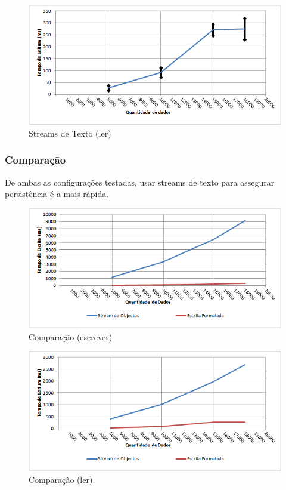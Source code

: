 \documentclass[a5paper,twocolumn, 11pt]{article}
\begin{document}
\begin{figure}[h!b!t!]
    \caption[Streams de Texto (ler)]{Streams de Texto (ler)}
    \centering
        \includegraphics[width=400pt]{ef_2.png}
\end{figure}

\newpage
\twocolumn
\subsubsection{Comparação}
De ambas as configurações testadas, usar streams de texto para assegurar persistência é a mais rápida.
\clearpage
\onecolumn
\begin{figure}[h!b!t!]
    \caption[Comparação (escrever)]{Comparação (escrever)}
    \centering
        \includegraphics[width=400pt]{cmp_1.png}
\end{figure}
\begin{figure}[h!b!t!]
    \caption[Comparação (ler)]{Comparação (ler)}
    \centering
        \includegraphics[width=400pt]{cmp_2.png}
\end{figure}
\end{document}
